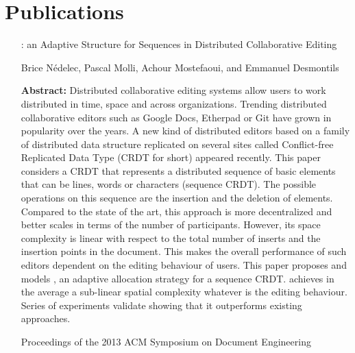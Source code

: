 
\section{Publications}

\begin{itemize}
\item [\LSEQ: an Adaptive Structure for Sequences in Distributed Collaborative Editing]
\item [Brice Nédelec, Pascal Molli, Achour Mostefaoui, and Emmanuel Desmontils]
\item [\textbf{Abstract:}] Distributed collaborative editing systems allow users
  to work distributed in time, space and across organizations. Trending
  distributed collaborative editors such as Google Docs, Etherpad or Git have
  grown in popularity over the years. A new kind of distributed editors based on
  a family of distributed data structure replicated on several sites called
  Conflict-free Replicated Data Type (CRDT for short) appeared recently. This
  paper considers a CRDT that represents a distributed sequence of basic
  elements that can be lines, words or characters (sequence CRDT). The possible
  operations on this sequence are the insertion and the deletion of
  elements. Compared to the state of the art, this approach is more
  decentralized and better scales in terms of the number of
  participants. However, its space complexity is linear with respect to the
  total number of inserts and the insertion points in the document. This makes
  the overall performance of such editors dependent on the editing behaviour of
  users. This paper proposes and models \LSEQ, an adaptive allocation strategy
  for a sequence CRDT. \LSEQ achieves in the average a sub-linear spatial
  complexity whatever is the editing behaviour. Series of experiments validate
  \LSEQ showing that it outperforms existing approaches.
\item [Proceedings of the 2013 ACM Symposium on Document Engineering]
\end{itemize}

